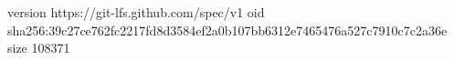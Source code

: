 version https://git-lfs.github.com/spec/v1
oid sha256:39c27ce762fc2217fd8d3584ef2a0b107bb6312e7465476a527c7910c7c2a36e
size 108371
